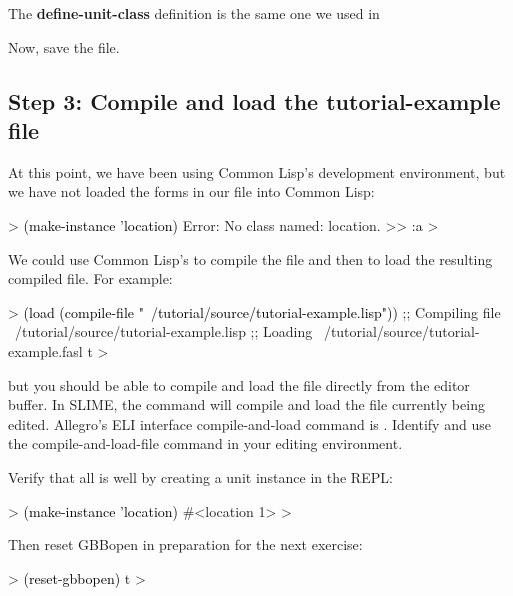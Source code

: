 \documentclass[10pt,twoside,english,pdftex]{article}
\begin{document}
The \textbf{define-unit-class} definition is the same one we used in

Now, save the file.  

\subsection*{Step 3: Compile and load the tutorial-example file}

At this point, we have been using Common Lisp's
development environment, but we have not loaded the forms in our file
into Common Lisp:
%
\begin{example}\color{darkergray}%
  > \textcolor{black}{(make-instance 'location)}
  Error: No class named: location.
  >> \textcolor{black}{:a}
  >
\end{example}

We could use Common Lisp's  to compile the file and
then  to load the resulting compiled file. For example:
%
\begin{example}\color{darkergray}%
  > \textcolor{black}{(load (compile-file "~/tutorial/source/tutorial-example.lisp"))}
  ;; Compiling file ~/tutorial/source/tutorial-example.lisp
  ;; Loading ~/tutorial/source/tutorial-example.fasl
  t
  >
\end{example}
%
but you should be able to compile and load the file directly from the
editor buffer.  In SLIME, the command  will compile and
load the file currently being edited.  Allegro's ELI interface
compile-and-load command is .  Identify and use the
compile-and-load-file command in your editing environment.

Verify that all is well by creating a  unit instance in
the REPL:
%
\begin{example}\color{darkergray}%
  > \textcolor{black}{(make-instance 'location)}
  #<location 1>
  >
\end{example}

%
Then reset GBBopen in preparation for the next exercise:
%
\begin{example}\color{darkergray}%
  > \textcolor{black}{(reset-gbbopen)}
  t
  >
\end{example}


\T\markright{}%
\T\pagestyle{plain}
\T\cleardoublepage
\W{}
\T\pagestyle{fancy}
\T\thispagestyle{fancybottom}
\T\renewcommand{\headrulewidth}{0pt}
\end{document}
